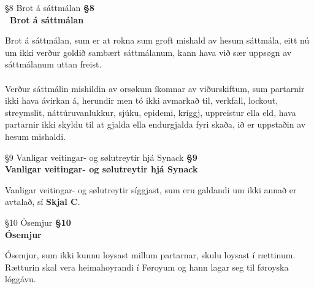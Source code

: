 \begin{center}
	 {§8 Brot á sáttmálan}
	\textbf{ §8 \\ Brot á sáttmálan}
\end{center}
Brot á sáttmálan, sum er at rokna sum groft mishald av hesum sáttmála, eitt nú um ikki verður goldið sambært sáttmálanum, kann hava við sær uppsøgn av sáttmálanum uttan freist. \\ \\
Verður sáttmálin mishildin av orsøkum íkomnar av viðurskiftum, sum partarnir ikki hava ávirkan á, herundir men tó ikki avmarkað til, verkfall, lockout, streymslit, náttúruvanlukkur, sjúku, epidemi, kríggj, uppreistur ella eld, hava partarnir ikki skyldu til at gjalda ella endurgjalda fyri skaða, ið er uppstaðin av hesum mishaldi.

\begin{center}
	 {§9 Vanligar veitingar- og sølutreytir hjá Synack}
	\textbf{§9 \\ Vanligar veitingar- og sølutreytir hjá Synack} \\
\end{center}
Vanligar veitingar- og sølutreytir síggjast, sum eru galdandi um ikki annað er avtalað, sí \textbf{Skjal C}.

\begin{center}
	 {§10 Ósemjur}
	\textbf{§10 \\ Ósemjur}
\end{center}
Ósemjur, sum ikki kunnu loysast millum partarnar, skulu loysast í rættinum. Rætturin skal vera heimahoyrandi í Føroyum og hann lagar seg til føroyska lóggávu.

\newpage
